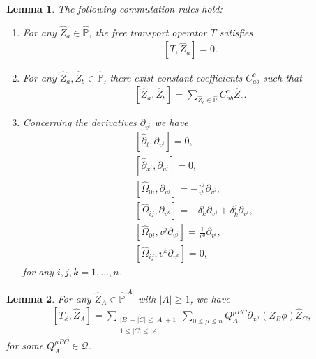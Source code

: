 \documentclass[10pt,a4paper]{amsart}
\newtheorem{lemma}{Lemma}
\newcommand{\bbp}{{\mathbb P}}
\newcommand{\cQ}{{\mathcal Q}}
\begin{document}
\begin{lemma} \label{lem basic}
The following commutation rules hold:
\begin{enumerate}
\item For any $ \hat{ Z }_a \in \hat{ \bbp } $, the free transport operator $ T $ satisfies
\begin{align*}
\left[ T , \hat{ Z }_a \right] = 0 .
\end{align*}
\item For any $ \hat{ Z }_a , \hat{ Z }_b \in \hat{ \bbp } $, there exist constant coefficients $ C_{ a b }^c $ such that
\begin{align*}
\left[ \hat{ Z }_a , \hat{ Z }_b \right] = \sum_{ \hat{ Z }_c \in \hat{ \bbp } } C_{ a b }^c \hat{ Z }_c .
\end{align*}
\item Concerning the derivatives $ \partial_{ v^i } $ we have
\begin{align*}
& \left[ \hat{ \partial }_t , \partial_{ v^i } \right] = 0 , \\
& \left[ \hat{ \partial }_{ x^i } , \partial_{ v^j } \right] = 0 ,\\
& \left[ \hat{ \Omega }_{ 0 i } , \partial_{ v^j } \right] = - \frac{ v^j }{ v^0 } \partial_{ v^i } , \\
& \left[ \hat{ \Omega }_{ i j } , \partial_{ v^k } \right] = - \delta^i_k \partial_{ v^j } + \delta^j_k \partial_{ v^i } , \\
& \left[ \hat{ \Omega }_{ 0 i } , v^j \partial_{ v^j } \right] = \frac{ 1 }{ v^0 } \partial_{ v^i } , \\
& \left[ \hat{ \Omega }_{ i j } , v^k \partial_{ v^k } \right] = 0 ,
\end{align*}
for any $ i , j , k = 1 , \dots , n $.
\end{enumerate}
\end{lemma}

\begin{lemma} \label{lem TphiZhat3}
For any $ \hat{ Z }_A \in \hat{ \bbp }^{ | A | } $ with $ | A | \geq 1 $, we have
\begin{align*}
\left[ T_\phi , \hat{ Z }_A \right] = \sum_{ \substack{ | B | + | C | \leq | A | + 1 \\ 1 \leq | C | \leq | A | } } \sum_{ 0 \leq \mu \leq n } Q^{ \mu B C }_{ A } \partial_{ x^\mu } ( Z_B \phi ) \hat{ Z }_C ,
\end{align*}
for some $ Q^{ \mu B C }_{ A } \in \cQ $.
\end{lemma}
\end{document}
